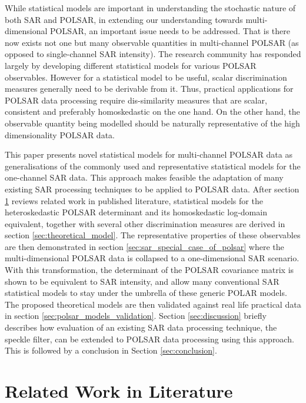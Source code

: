 \documentclass[journal]{IEEEtran}
\begin{document}
While statistical models are important in understanding the stochastic nature of both SAR and POLSAR, in extending our understanding towards multi-dimensional POLSAR, an important issue needs to be addressed.
That is there now exists not one but many observable quantities in multi-channel POLSAR (as opposed to single-channel SAR intensity).
The research community has responded largely by developing different statistical models for various POLSAR observables.
However for a statistical model to be useful, scalar discrimination measures generally need to be derivable from it.
Thus, practical applications for POLSAR data processing require dis-similarity measures that are scalar, consistent and preferably homoskedastic on the one hand.
On the other hand, the observable quantity being modelled should be naturally representative of the high dimensionality POLSAR data.

This paper presents novel statistical models for multi-channel POLSAR data as generalisations of the commonly used and representative statistical models for the one-channel SAR data.
This approach makes feasible the adaptation of many existing SAR processing techniques to be applied to POLSAR data.
After section \ref{sec:lit_review} reviews related work in published literature, statistical models for the heteroskedastic POLSAR determinant and its homoskedastic log-domain equivalent, together with several other discrimination measures are derived in section  \ref{sec:theoretical_model}.
The representative properties of these observables are then demonstrated in section \ref{sec:sar_special_case_of_polsar}
  where the multi-dimensional POLSAR data is collapsed to a one-dimensional SAR scenario.
With this transformation, the determinant of the POLSAR covariance matrix is shown to be equivalent to SAR intensity,
  and allow many conventional SAR statistical models to stay under the umbrella of these generic POLAR models.
The proposed theoretical models are then validated against real life practical data in section \ref{sec:polsar_models_validation}.
Section \ref{sec:discussion} briefly describes how evaluation of an existing SAR data processing technique, the speckle filter, can be extended to  POLSAR data processing using this approach.
This is followed by a conclusion in Section \ref{sec:conclusion}.

\section{Related Work in Literature}
\label{sec:lit_review}
\end{document}
